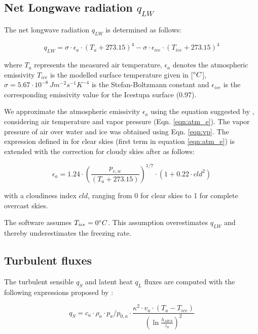 \documentclass[utf8]{frontiersSCNS}
\begin{document}
\subsection{Net Longwave radiation \texorpdfstring{$q_{LW}$}{Lg}} \label{sec:LW}
The net longwave radiation $q_{LW}$ is determined as follows:

\begin{equation}
	q_{LW}= \sigma \cdot \epsilon_a \cdot {(T_a+ 273.15)}^4 -\sigma \cdot \epsilon_{ice} \cdot {(T_{ice}+ 273.15)}^4
	\label{eqn:LW}
\end{equation}

where $T_a$ represents the measured air temperature, $\epsilon_a$ denotes the atmospheric emissivity $T_{ice}$
is the modelled surface temperature given in [$\degree C$], $\sigma=5.67\cdot10^{-8}\,Jm^{-2}s^{-1}K^{-4}$ is
the Stefan-Boltzmann constant and $\epsilon_{ice}$ is the corresponding emissivity value for the Icestupa
surface (0.97).

We approximate the atmospheric emissivity $\epsilon_a$ using the equation suggested by \cite{Brutsaert_1975},
considering air temperature and vapor pressure (Eqn. \ref{eqn:atm_e}). The vapor pressure of air over water and
ice was obtained using Eqn. \ref{eqn:vp}.  The expression defined in \cite{Brutsaert_1975} for clear skies
(first term in equation \ref{eqn:atm_e}) is extended with the correction for cloudy skies after
\cite{Brutsaert_1982} as follows:

\begin{equation}
	\epsilon_a=1.24 \cdot (\frac{p_{v,w}}{(T_a+273.15)})^{1/7}\cdot(1+0.22\cdot{cld}^2) \label{eqn:atm_e}
\end{equation}

with a cloudiness index $cld$, ranging from 0 for clear skies to 1 for complete overcast skies. 

The software assumes $T_{ice} = 0 \degree C$. This assumption overestimates $q_{LW}$ and thereby underestimates
the freezing rate.

\subsection{Turbulent fluxes} \label{sec:Qs}

The turbulent sensible $q_{S}$ and latent heat $q_{L}$ fluxes are computed with the following expressions
proposed by \cite{Garratt_1992}:

\begin{equation}
	q_{S}= c_{a} \cdot \rho_{a} \cdot p_{a}/p_{0,a} \cdot \frac{\kappa^2 \cdot v_a \cdot
		(T_a-T_{ice})}{{(\ln{\frac{h_{AWS}}{z_{0}}})}^2}
	\label{eqn:qs}
\end{equation}
\end{document}
